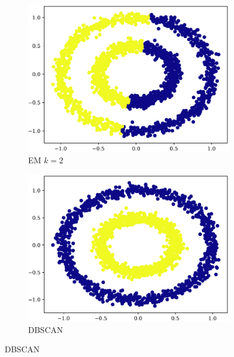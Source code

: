 \begin{figure}[t!]
    \begin{subfigure}[b]{0.45\textwidth}
        \includegraphics[width=\textwidth]{../plots/circle_em.pdf}
        \caption{EM $k = 2$}
        \label{subfig:circle-em}
    \end{subfigure}
    \hspace{0.09\textwidth}
    \begin{subfigure}[b]{0.45\textwidth}
        \includegraphics[width=\textwidth]{../plots/circle_dbscan.pdf}
        \caption{DBSCAN}
        \label{subfig:circle-dbscan}
    \end{subfigure}
\end{figure}
